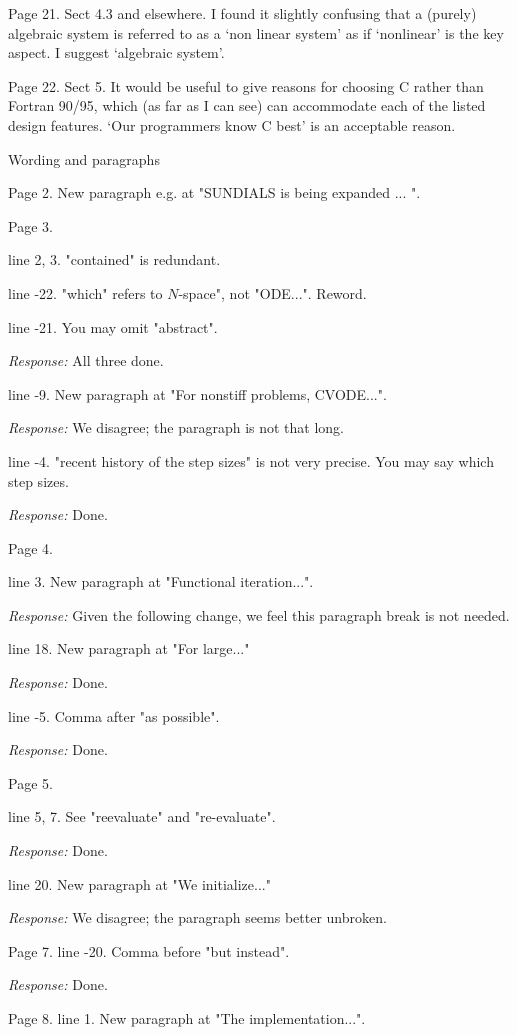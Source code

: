 \documentclass[12pt]{letter}
\begin{document}
Page 21. Sect 4.3 and elsewhere. I found it slightly confusing that a
(purely) algebraic system is referred to as a `non linear system' as
if `nonlinear' is the key aspect.  I suggest `algebraic system'.

Page 22. Sect 5. It would be useful to give reasons for choosing C
rather than Fortran 90/95, which (as far as I can see) can accommodate
each of the listed design features.  `Our programmers know C best' is
an acceptable reason.

Wording and paragraphs
 
Page 2. New paragraph e.g. at "SUNDIALS is being expanded ... ". 
 
Page 3.  

line 2, 3. "contained" is redundant.  

line -22. "which" refers to $N$-space", not "ODE...". Reword.  

line -21. You may omit "abstract".  

{\em Response:} All three done.

line -9. New paragraph at "For nonstiff problems, CVODE...".  

{\em Response:} We disagree; the paragraph is not that long.

line -4. "recent history of the step sizes" is not very precise. You
may say which step sizes.

{\em Response:} Done.

Page 4.

line 3. New paragraph at "Functional iteration...".  

{\em Response:} Given the following change, we feel this paragraph
break is not needed.

line 18. New paragraph at "For large..."  

{\em Response:} Done.

line -5. Comma after "as possible". 

{\em Response:} Done.
 
Page 5.

line 5, 7. See "reevaluate" and "re-evaluate".  

{\em Response:} Done.

line 20. New paragraph at "We initialize..."  

{\em Response:} We disagree; the paragraph seems better unbroken.

Page 7.
line -20. Comma before "but instead". 

{\em Response:} Done.

Page 8.  
line 1. New paragraph at "The implementation...". 
\end{document}
